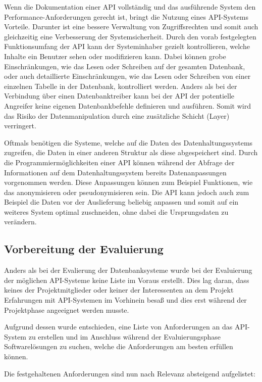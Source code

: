Wenn die Dokumentation einer API vollständig und das ausführende System den
Performance\hyp{}Anforderungen gerecht ist, bringt die Nutzung eines
API\hyp{}Systems Vorteile. Darunter ist eine bessere Verwaltung von
Zugriffsrechten und somit auch gleichzeitig eine Verbesserung der
Systemsicherheit. Durch den vorab festgelegten Funktionsumfang der API kann der
Systeminhaber gezielt kontrollieren, welche Inhalte ein Benutzer sehen oder
modifizieren kann. Dabei können grobe Einschränkungen, wie das Lesen oder
Schreiben auf der gesamten Datenbank, oder auch detaillierte Einschränkungen,
wie das Lesen oder Schreiben von einer einzelnen Tabelle in der Datenbank,
kontrolliert werden. Anders als bei der Verbindung über einen Datenbanktreiber
kann bei der API der potentielle Angreifer keine eigenen Datenbankbefehle
definieren und ausführen. Somit wird das Risiko der Datenmanipulation durch
eine zusätzliche Schicht (Layer) verringert.

Oftmals benötigen die Systeme, welche auf die Daten des Datenhaltungssystems
zugreifen, die Daten in einer anderen Struktur als diese abgespeichert sind.
Durch die Programmiermöglichkeiten einer API können während der Abfrage der
Informationen auf dem Datenhaltungssystem bereits Datenanpassungen vorgenommen
werden. Diese Anpassungen können zum Beispiel Funktionen, wie das anonymisieren
oder pseudonymisieren sein. Die API kann jedoch auch zum Beispiel die Daten vor
der Auslieferung beliebig anpassen und somit auf ein weiteres System optimal
zuschneiden, ohne dabei die Ursprungsdaten zu verändern.
\nl%

\subsection{Vorbereitung der Evaluierung}
\label{subsec:api_vorbereitung_der_evaluierung}
Anders als bei der Evalierung der Datenbanksysteme wurde bei der Evaluierung
der möglichen API\hyp{}Systeme keine Liste im Voraus erstellt. Dies lag daran,
dass keines der Projektmitglieder oder keiner der Interessenten an dem Projekt
Erfahrungen mit API\hyp{}Systemen im Vorhinein besaß und dies erst während der
Projektphase angeeignet werden musste.

Aufgrund dessen wurde entschieden, eine Liste von Anforderungen an das
API\hyp{}System zu erstellen und im Anschluss während der Evaluierungsphase
Softwarelösungen zu suchen, welche die Anforderungen am besten erfüllen können.

Die festgehaltenen Anforderungen sind nun nach Relevanz absteigend aufgelistet:

